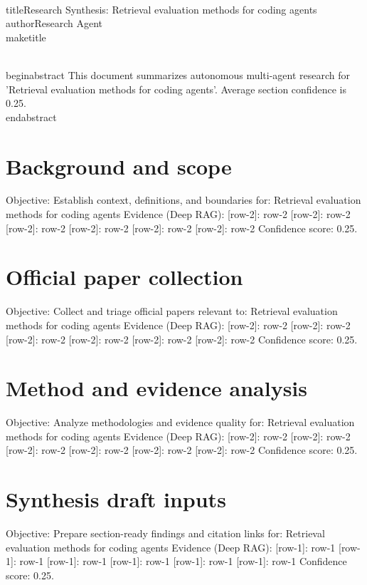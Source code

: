\documentclass[conference]{IEEEtran}
\begin{document}
\\titleResearch Synthesis: Retrieval evaluation methods for coding agents
\\authorResearch Agent
\\maketitle

\\begin{abstract}
This document summarizes autonomous multi-agent research for 'Retrieval evaluation methods for coding agents'. Average section confidence is 0.25.
\\end{abstract}

\section{Background and scope}
Objective: Establish context, definitions, and boundaries for: Retrieval evaluation methods for coding agents
Evidence (Deep RAG):
[row-2]: row-2
[row-2]: row-2
[row-2]: row-2
[row-2]: row-2
[row-2]: row-2
[row-2]: row-2
Confidence score: 0.25. \cite{t1_fake_1,t4_fake_2,t4_fake_1}

\section{Official paper collection}
Objective: Collect and triage official papers relevant to: Retrieval evaluation methods for coding agents
Evidence (Deep RAG):
[row-2]: row-2
[row-2]: row-2
[row-2]: row-2
[row-2]: row-2
[row-2]: row-2
[row-2]: row-2
Confidence score: 0.25. \cite{t1_fake_2,f2_fake_2,t3_fake_1}

\section{Method and evidence analysis}
Objective: Analyze methodologies and evidence quality for: Retrieval evaluation methods for coding agents
Evidence (Deep RAG):
[row-2]: row-2
[row-2]: row-2
[row-2]: row-2
[row-2]: row-2
[row-2]: row-2
[row-2]: row-2
Confidence score: 0.25. \cite{t4_fake_2,t2_fake_1,f1_fake_2}

\section{Synthesis draft inputs}
Objective: Prepare section-ready findings and citation links for: Retrieval evaluation methods for coding agents
Evidence (Deep RAG):
[row-1]: row-1
[row-1]: row-1
[row-1]: row-1
[row-1]: row-1
[row-1]: row-1
[row-1]: row-1
Confidence score: 0.25. \cite{f1_fake_2,f1_fake_1,t2_fake_2}
\end{document}
